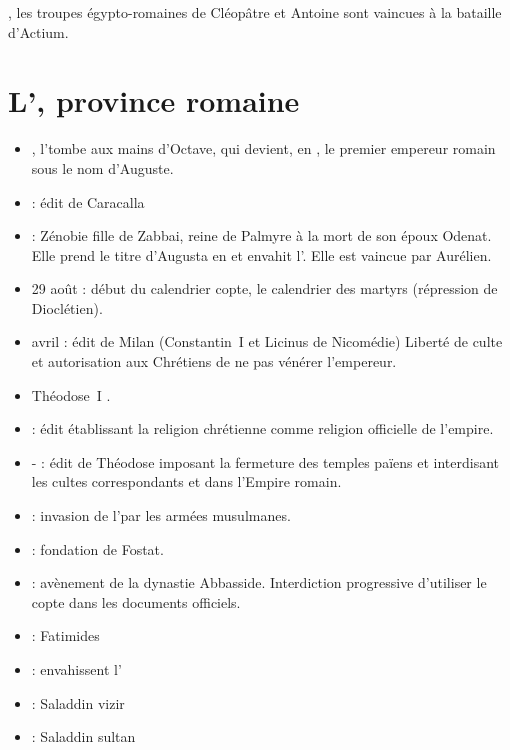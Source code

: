 , les troupes égypto-romaines de Cléopâtre et Antoine sont 
vaincues à la bataille d'Actium.

\section{L'\kmt, province romaine}

\begin{itemize}\setlength\itemsep{0.8\baselineskip}
  \item {}, l'\kmt tombe aux mains d'Octave, qui devient, 
        en , le premier empereur romain sous le nom d'Auguste.
  \item {} : édit de Caracalla
  \item {} : Zénobie fille de Zabbai, reine de Palmyre à 
        la mort de son époux Odenat. Elle prend le titre d'Augusta en 
         et envahit l'\kmt. Elle est vaincue par Aurélien.
  \item 29 août  : début du calendrier copte, le 
        \og calendrier des martyrs \fg (répression de Dioclétien).
  \item avril  : édit de Milan (Constantin~I\ier{} 
         et Licinus de Nicomédie) 
        Liberté de culte et autorisation aux Chrétiens de ne pas 
        vénérer l'empereur.
  \item Théodose~I\ier{} .
  \item {} : édit établissant la religion chrétienne comme 
        religion officielle de l'empire.
  \item {}- : édit de Théodose imposant la 
        fermeture des temples païens et interdisant les cultes 
        correspondants et dans l'Empire romain.
  \item {} : invasion de l'\kmt par les armées musulmanes.
  \item {} : fondation de Fostat.
  \item {} : avènement de la dynastie Abbasside. 
        Interdiction progressive d'utiliser le copte dans les 
        documents officiels.

  \item {} : Fatimides
  \item {} : envahissent l'\kmt
  \item {} : Saladdin vizir
  \item {} : Saladdin sultan
\end{itemize}


